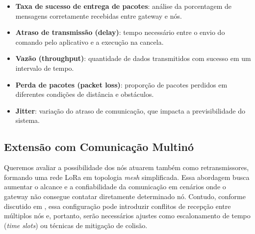 \documentclass[
article,			%
11pt,				%
twoside,			%
a4paper,			%
section=TITLE,		%
onecolumn,          %
english,			%
brazil,				%
sumario=tradicional
]{abntex2}
\begin{document}
    \begin{itemize}
        \item \textbf{Taxa de sucesso de entrega de pacotes}: análise da porcentagem de mensagens corretamente recebidas entre gateway e nós.
        \item \textbf{Atraso de transmissão (delay)}: tempo necessário entre o envio do comando pelo aplicativo e a execução na cancela.
        \item \textbf{Vazão (throughput)}: quantidade de dados transmitidos com sucesso em um intervalo de tempo.
        \item \textbf{Perda de pacotes (packet loss)}: proporção de pacotes perdidos em diferentes condições de distância e obstáculos.
        \item \textbf{Jitter}: variação do atraso de comunicação, que impacta a previsibilidade do sistema.
    \end{itemize}
    
    \subsection{Extensão com Comunicação Multinó}
    Queremos avaliar a possibilidade dos nós atuarem também como retransmissores, formando uma rede LoRa em topologia \textit{mesh} simplificada. Essa abordagem busca aumentar o alcance e a confiabilidade da comunicação em cenários onde o gateway não consegue contatar diretamente determinado nó. Contudo, conforme discutido em \cite{huh2019} \cite{rahmatullah2025}, essa configuração pode introduzir conflitos de recepção entre múltiplos nós e, portanto, serão necessários ajustes como escalonamento de tempo (\textit{time slots}) ou técnicas de mitigação de colisão.




    
\end{document}
